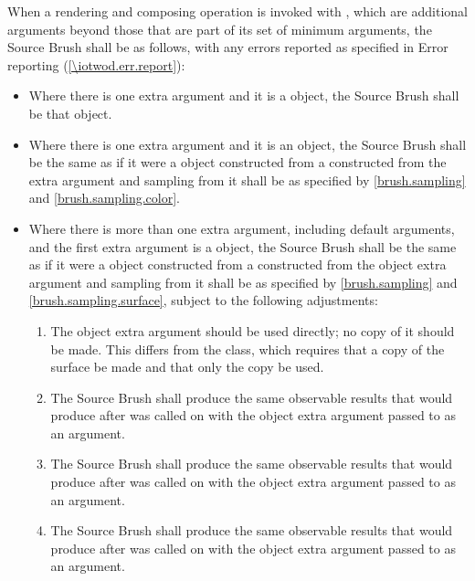 \pnum
When a rendering and composing operation is invoked with , which are additional arguments beyond those that are part of its set of minimum arguments, the Source Brush shall be as follows, with any errors reported as specified in Error reporting (\ref{\iotwod.err.report}):
\begin{itemize}
	\item Where there is one extra argument and it is a  object, the Source Brush shall be that  object.
	\item Where there is one extra argument and it is an  object, the Source Brush shall be the same as if it were a  object constructed from a  constructed from the extra argument and sampling from it shall be as specified by \ref{brush.sampling} and \ref{brush.sampling.color}.
	\item Where there is more than one extra argument, including default arguments, and the first extra argument is a  object, the Source Brush shall be the same as if it were a  object  constructed from a  constructed from the  object extra argument and sampling from it shall be as specified by \ref{brush.sampling} and \ref{brush.sampling.surface}, subject to the following adjustments:
	\begin{enumerate}
		\item The  object extra argument should be used directly; no copy of it should be made. This differs from the  class, which requires that a copy of the surface be made and that only the copy be used.
		\item The Source Brush shall produce the same observable results that  would produce after  was called on  with the  object extra argument passed to  as an argument.
		\item The Source Brush shall produce the same observable results that  would produce after  was called on  with the  object extra argument passed to  as an argument.
		\item The Source Brush shall produce the same observable results that  would produce after  was called on  with the  object extra argument passed to  as an argument.
	\end{enumerate}
\end{itemize}

